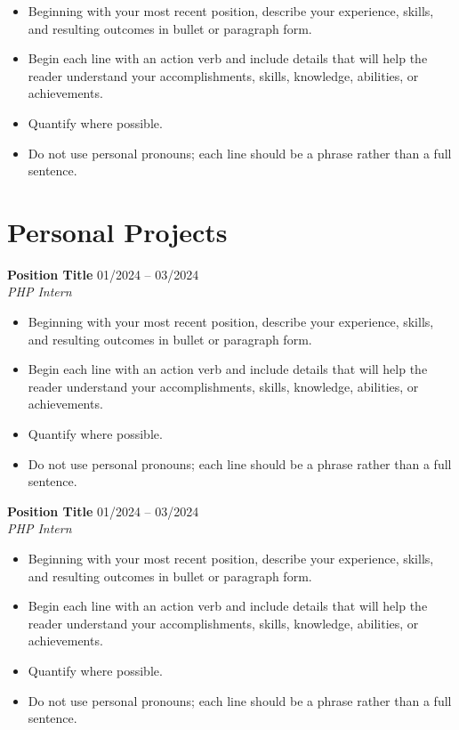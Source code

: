 \documentclass[11pt]{article}
\begin{document}
\begin{itemize}[noitemsep, topsep=0pt, partopsep=0pt, parsep=0pt]
    \item Beginning with your most recent position, describe your experience, skills, and resulting outcomes in bullet or paragraph form.
    \item Begin each line with an action verb and include details that will help the reader understand your accomplishments, skills, knowledge, abilities, or achievements.
    \item Quantify where possible.
    \item Do not use personal pronouns; each line should be a phrase rather than a full sentence.
\end{itemize}

\section*{Personal Projects}

\noindent \textbf{Position Title} \hfill 01/2024 -- 03/2024 \\
\textit{PHP Intern} \hfill %

\begin{itemize}[noitemsep, topsep=0pt, partopsep=0pt, parsep=0pt]
    \item Beginning with your most recent position, describe your experience, skills, and resulting outcomes in bullet or paragraph form.
    \item Begin each line with an action verb and include details that will help the reader understand your accomplishments, skills, knowledge, abilities, or achievements.
    \item Quantify where possible.
    \item Do not use personal pronouns; each line should be a phrase rather than a full sentence.
\end{itemize}

\vspace{6pt}

\noindent \textbf{Position Title} \hfill 01/2024 -- 03/2024 \\
\textit{PHP Intern} \hfill %

\begin{itemize}[noitemsep, topsep=0pt, partopsep=0pt, parsep=0pt]
    \item Beginning with your most recent position, describe your experience, skills, and resulting outcomes in bullet or paragraph form.
    \item Begin each line with an action verb and include details that will help the reader understand your accomplishments, skills, knowledge, abilities, or achievements.
    \item Quantify where possible.
    \item Do not use personal pronouns; each line should be a phrase rather than a full sentence.
\end{itemize}
\end{document}
